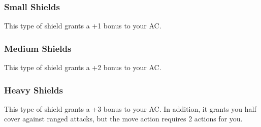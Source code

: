 \subsubsection{Small Shields} \label{ssec::smallshields}
This type of shield grants a +1 bonus to your AC.

\subsubsection{Medium Shields} \label{ssec::mediumshields}
This type of shield grants a +2 bonus to your AC.

\subsubsection{Heavy Shields} \label{ssec::heavyshields}
This type of shield grants a +3 bonus to your AC.
In addition, it grants you half cover against ranged attacks, but the move action requires 2 actions for you.
